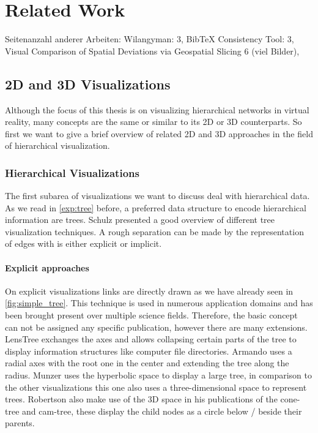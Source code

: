 \chapter{Related Work}
Seitenanzahl anderer Arbeiten: Wilangyman: 3, BibTeX Consistency Tool: 3, Visual Comparison of Spatial Deviations via Geospatial Slicing 6 (viel Bilder), 

\section{2D and 3D Visualizations}

Although the focus of this thesis is on visualizing hierarchical networks in virtual reality, many concepts are the same or similar to its 2D or 3D counterparts. So first we want to give a brief overview of related 2D and 3D approaches in the field of hierarchical visualization.

\subsection{Hierarchical Visualizations}

The first subarea of visualizations we want to discuss deal with hierarchical data. As we read in \ref{exp:tree} before, a preferred data structure to encode hierarchical information are trees.
Schulz \cite{schulz_treevisnet_2011} presented a good overview of different tree visualization techniques. A rough separation can be made by the representation of edges with is either explicit or implicit. 

\subsubsection{Explicit approaches}
On explicit visualizations links are directly drawn as we have already seen in \ref{fig:simple_tree}. This technique is used in numerous application domains and has been brought present over multiple science fields. Therefore, the basic concept can not be assigned any specific publication, however there are many extensions. 
LensTree \cite{song_lenstree_2006} exchanges the axes and allows collapsing certain parts of the tree to display information structures like computer file directories. 
Armando \cite{arce-orozco_radial_2017} uses a radial axes with the root one in the center and extending the tree along the radius. 
Munzer \cite{munzner_h3_1997} uses the hyperbolic space to display a large tree, in comparison to the other visualizations this one also uses a three-dimensional space to represent trees.
Robertson \cite{robertson_cone_1991} also make use of the 3D space in his publications of the cone-tree and cam-tree, these display the child nodes as a circle below / beside their parents.  

